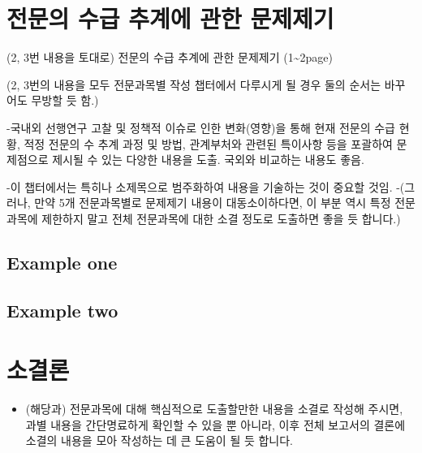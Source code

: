 \documentclass[]{book}
\providecommand{\tightlist}{%
  \setlength{\itemsep}{0pt}\setlength{\parskip}{0pt}}
\begin{document}
\hypertarget{section-9}{%
\chapter{전문의 수급 추계에 관한 문제제기}\label{section-9}}

(2, 3번 내용을 토대로) 전문의 수급 추계에 관한 문제제기 (1\textasciitilde2page)

(2, 3번의 내용을 모두 전문과목별 작성 챕터에서 다루시게 될 경우 둘의 순서는 바꾸어도 무방할 듯 함.)

-국내외 선행연구 고찰 및 정책적 이슈로 인한 변화(영향)을 통해 현재 전문의 수급 현황, 적정 전문의 수 추계 과정 및 방법, 관계부처와 관련된 특이사항 등을 포괄하여 문제점으로 제시될 수 있는 다양한 내용을 도출. 국외와 비교하는 내용도 좋음.

-이 챕터에서는 특히나 소제목으로 범주화하여 내용을 기술하는 것이 중요할 것임.
-(그러나, 만약 5개 전문과목별로 문제제기 내용이 대동소이하다면, 이 부분 역시 특정 전문과목에 제한하지 말고 전체 전문과목에 대한 소결 정도로 도출하면 좋을 듯 합니다.)

\hypertarget{example-one}{%
\section{Example one}\label{example-one}}

\hypertarget{example-two}{%
\section{Example two}\label{example-two}}

\hypertarget{section-10}{%
\chapter{소결론}\label{section-10}}

\begin{itemize}
\tightlist
\item
  (해당과) 전문과목에 대해 핵심적으로 도출할만한 내용을 소결로 작성해 주시면, 과별 내용을 간단명료하게 확인할 수 있을 뿐 아니라, 이후 전체 보고서의 결론에 소결의 내용을 모아 작성하는 데 큰 도움이 될 듯 합니다.
\end{itemize}


\end{document}
